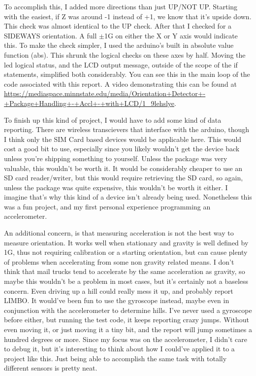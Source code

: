 \documentclass[prb,preprint]{revtex4-1}
\begin{document}
To accomplish this, I added more directions than just UP/NOT UP. Starting with the easiest, if Z was around -1 instead of +1, we know that it's upside down. This check was almost identical to the UP check. After that I checked for a SIDEWAYS orientation. A full $\pm$1G on either the X or Y axis would indicate this. To make the check simpler, I used the arduino's built in absolute value function (abs). This shrunk the logical checks on these axes by half. Moving the led logical status, and the LCD output message, outside of the scope of the if statements, simplified both considerably. You can see this in the main loop of the code associated with this report. A video demonstrating this can be found at \url{https://mediaspace.minnstate.edu/media/Orientation+Detector+-+Package+Handling+-+Accl+-+with+LCD/1_9lehslye}.

To finish up this kind of project, I would have to add some kind of data reporting. There are wireless transcievers that interface with the arduino, though I think only the SIM Card based devices would be applicable here. This would cost a good bit to use, especially since you likely wouldn't get the device back unless you're shipping something to yourself. Unless the package was very valuable, this wouldn't be worth it. It would be considerably cheaper to use an SD card reader/writer, but this would require retrieving the SD card, so again, unless the package was quite expensive, this wouldn't be worth it either. I imagine that's why this kind of a device isn't already being used. Nonetheless this was a fun project, and my first personal experience programming an accelerometer. 

An additional concern, is that measuring acceleration is not the best way to measure orientation. It works well when stationary and gravity is well defined by 1G, thus not requiring calibration or a starting orientation, but can cause plenty of problems when accelerating from some non gravity related means. I don't think that mail trucks tend to accelerate by the same acceleration as gravity, so maybe this wouldn't be a problem in most cases, but it's certainly not a baseless concern. Even driving up a hill could really mess it up, and probably report LIMBO. It would've been fun to use the gyroscope instead, maybe even in conjunction with the accelerometer to determine hills. I've never used a gyroscope before either, but running the test code, it keeps reporting crazy jumps. Without even moving it, or just moving it a tiny bit, and the report will jump sometimes a hundred degrees or more. Since my focus was on the accelerometer, I didn't care to debug it, but it's interesting to think about how I could've applied it to a project like this. Just being able to accomplish the same task with totally different sensors is pretty neat.



\end{document}

